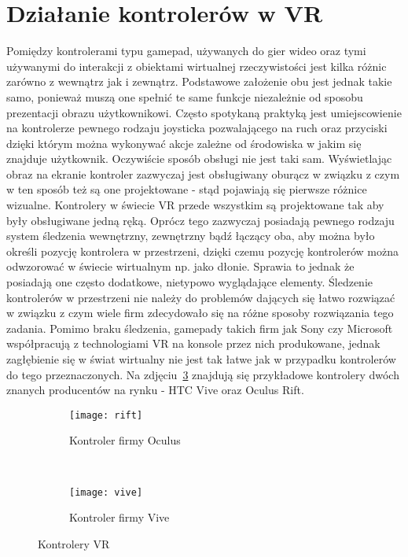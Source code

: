 \section{Działanie kontrolerów w VR}
\label{sec:kontroleryVR}
Pomiędzy kontrolerami typu gamepad, używanych do gier wideo oraz tymi używanymi do interakcji z obiektami wirtualnej rzeczywistości jest kilka różnic zarówno z wewnątrz jak i zewnątrz. Podstawowe założenie obu jest jednak takie samo, ponieważ muszą one spełnić te same funkcje niezależnie od sposobu prezentacji obrazu użytkownikowi. Często spotykaną praktyką jest umiejscowienie na kontrolerze pewnego rodzaju joysticka pozwalającego na ruch oraz przyciski dzięki którym można wykonywać akcje zależne od środowiska w jakim się znajduje użytkownik. Oczywiście sposób obsługi nie jest taki sam. Wyświetlając obraz na ekranie kontroler zazwyczaj jest obsługiwany oburącz w związku z czym w ten sposób też są one projektowane - stąd pojawiają się pierwsze różnice wizualne. Kontrolery w świecie VR przede wszystkim są projektowane tak aby były obsługiwane jedną ręką. Oprócz tego zazwyczaj posiadają pewnego rodzaju system śledzenia wewnętrzny, zewnętrzny bądź łączący oba, aby można było określi pozycję kontrolera w przestrzeni, dzięki czemu pozycję kontrolerów można odwzorować w świecie wirtualnym np. jako dłonie. Sprawia to jednak że posiadają one często dodatkowe, nietypowo wyglądające elementy. Śledzenie kontrolerów w przestrzeni nie należy do problemów dających się łatwo rozwiązać w związku z czym wiele firm zdecydowało się na różne sposoby rozwiązania tego zadania. Pomimo braku śledzenia, gamepady takich firm jak Sony czy Microsoft współpracują z technologiami VR na konsole przez nich produkowane, jednak zagłębienie się w świat wirtualny nie jest tak łatwe jak w przypadku kontrolerów do tego przeznaczonych. Na zdjęciu~\ref{fig:kontrolery} znajdują się przykładowe kontrolery dwóch znanych producentów na rynku - HTC Vive oraz Oculus Rift.
\begin{figure}[h]
\centering
	\begin{subfigure}[b]{0.45\textwidth}
	\texttt{[image: rift]}
	\caption{Kontroler firmy Oculus~\cite{con1}}
	\label{fig:ctrlRift}
	\end{subfigure}
	~
	\begin{subfigure}[b]{0.45\textwidth}
	\texttt{[image: vive]}
	\caption{Kontroler firmy Vive~\cite{con2}}
	\label{fig:ctrlVive}
	\end{subfigure}
\caption{Kontrolery VR}
\label{fig:kontrolery}
\end{figure}
